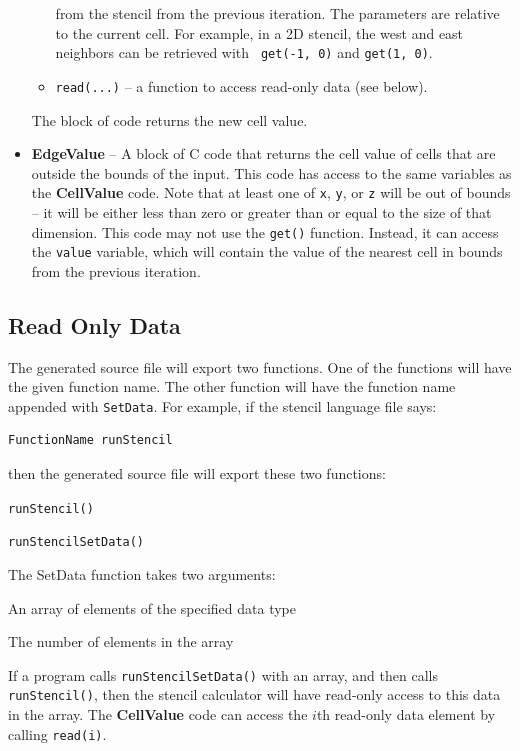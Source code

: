 \documentclass[preprint,nocopyrightspace]{styles/sigplanconf}
\begin{document}
\begin{itemize}
\begin{itemize}
  from the stencil from the previous iteration.  The parameters are
  relative to the current cell.  For example, in a 2D
  stencil, the west and east neighbors can be retrieved with {\tt
    get(-1, 0)} and {\tt get(1, 0)}.
\item {\tt read(...)} -- a function to access read-only data (see below).
\end{itemize}
The block of code returns the new cell value.
\item {\bf EdgeValue} -- A block of C code that returns the cell value
  of cells that are outside the bounds of the input.  This code has
  access to the same variables as the {\bf CellValue} code.  Note that
  at least one of {\tt x}, {\tt y}, or {\tt z} will be out of bounds
  -- it will be either less than zero or greater than or equal to the
  size of that dimension.  This code may not use the {\tt get()}
  function.  Instead, it can access the {\tt value} variable, which
  will contain the value of the nearest cell in bounds from the
  previous iteration.
\end{itemize}

\subsection{Read Only Data}

The generated source file will export two functions.  One of the
functions will have the given function name.  The other function will
have the function name appended with {\tt SetData}.  For example, if
the stencil language file says:
\begin{verbatim}
FunctionName runStencil
\end{verbatim}
then the generated source file will export these two functions:
\begin{itemize*}
\item {\tt runStencil()}
\item {\tt runStencilSetData()}
\end{itemize*}

\noindent The SetData function takes two arguments:
\begin{enumerate*}
\item An array of elements of the specified data type
\item The number of elements in the array
\end{enumerate*}
If a program calls {\tt runStencilSetData()} with an
array, and then calls {\tt runStencil()}, then the stencil
calculator will have read-only access to this data in the array.  The
{\bf CellValue} code can access the $i$th read-only data element by
calling {\tt read(i)}.
\end{document}
